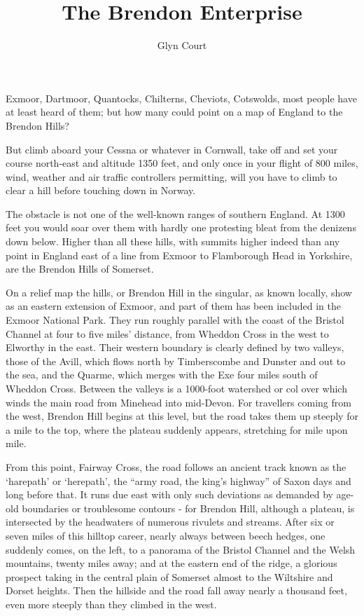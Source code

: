 \documentclass[10pt,a4paper]{article}
\title{The Brendon Enterprise}
\author{Glyn Court}
\date{}
\begin{document}
\maketitle

Exmoor, Dartmoor, Quantocks, Chilterns, Cheviots, Cotswolds, most people have at least heard of them; but how many could point on a map of England to the Brendon Hills?

But climb aboard your Cessna or whatever in Cornwall, take off and set your course north-east and altitude 1350 feet, and only once in your flight of 800 miles, wind, weather and air traffic controllers permitting, will you have to climb to clear a hill before touching down in Norway.

The obstacle is not one of the well-known ranges of southern England.  At 1300 feet you would soar over them with hardly one protesting bleat from the denizens down below. Higher than all these  hills, with summits higher indeed than any point in England east of a line from Exmoor to Flamborough Head in Yorkshire, are the Brendon Hills of Somerset.

On a relief map the hills, or Brendon Hill in the singular, as known locally, show as an eastern extension of Exmoor, and part of them has been included in the Exmoor National Park.   They run roughly parallel with the coast of the Bristol Channel at four to five miles' distance, from Wheddon Cross in the west to Elworthy in the east. Their western boundary is clearly defined  by two valleys,  those of the Avill, which flows north by Timberscombe and Dunster and out to the sea,  and the Quarme, which merges with the Exe four miles south of Wheddon Cross.  Between the valleys is a 1000-foot watershed or col over which winds the main road from Minehead into mid-Devon. For travellers coming from the west, Brendon Hill begins at this level, but the road takes them up steeply for a mile to the top, where the plateau suddenly appears, stretching for mile upon mile.

From this point, Fairway Cross, the road follows an ancient track known as the ‘harepath’ or ‘herepath’, the “army road, the king’s highway” of Saxon days and long before that. It runs due east with only such deviations as demanded  by age-old boundaries or troublesome contours - for Brendon Hill, although a plateau, is intersected by the headwaters of numerous rivulets and streams. After six or seven miles of this hilltop career, nearly always between beech hedges, one suddenly comes, on the left,  to a panorama of the Bristol Channel and the Welsh mountains, twenty miles away; and at the eastern end of the ridge, a glorious prospect taking in the central plain of Somerset almost to the Wiltshire and Dorset heights. Then the hillside and the road fall away nearly a thousand feet, even more steeply than they climbed in the west.
\end{document}
